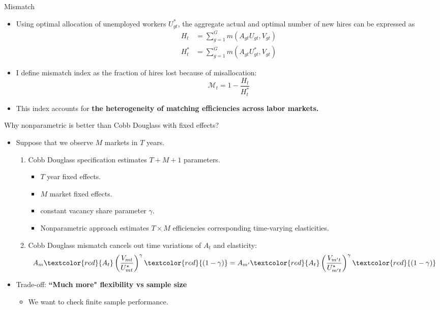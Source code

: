 \documentclass[aspectratio=169]{beamer}
\begin{document}
\begin{frame}{Mismatch}
    \begin{itemize}
    \item Using optimal allocation of unemployed workers $U_{g t}^*$, the aggregate actual and optimal number of new hires can be expressed as
$$
\begin{aligned}
H_t & =\sum_{g=1}^G m\left(A_{g t} U_{g t}, V_{g t}\right) \\
H_t^* & =\sum_{g=1}^G m\left(A_{g t} U_{g t}^*, V_{g t}\right)
\end{aligned}
$$
\item I define mismatch index as the fraction of hires lost because of misallocation:
$$
\mathcal{M}_t=1-\frac{H_t}{H_t^*}
$$

\item This index accounts for \textbf{the heterogeneity of matching efficiencies across labor markets.}
\end{itemize}
\end{frame}

\begin{frame}{Why nonparametric is better than Cobb Douglass with fixed effects?}
\begin{itemize}
    \item Suppose that we observe $M$ markets in $T$ years.
    \begin{enumerate}
        \item Cobb Douglass specification estimates $T+M+1$ parameters.
        \begin{itemize}
        \item $T$ year fixed effects.
        \item $M$ market fixed effects.
        \item constant vacancy share parameter $\gamma$.
        \item Nonparametric approach estimates $T\times M$ efficiencies corresponding time-varying elasticities.
        \end{itemize}
        \item Cobb Douglass mismatch cancels out time variations of $A_{t}$ and elasticity:
        \begin{align*}
        A_{m}\textcolor{red}{A_{t}}\left(\frac{V_{m t}}{U_{m t}^{\star}}\right)^\gamma \textcolor{red}{(1-\gamma)}=A_{m'}\textcolor{red}{A_{t}}\left(\frac{V_{m' t}}{U_{m' t}^{\star}}\right)^\gamma\textcolor{red}{ (1-\gamma)}
    \end{align*}
    \end{enumerate}
    
    \item Trade-off: \textbf{``Much more" flexibility vs sample size}
    \begin{itemize}
        \item We want to check finite sample performance.
    \end{itemize}
\end{itemize}
    
\end{frame}
\end{document}
